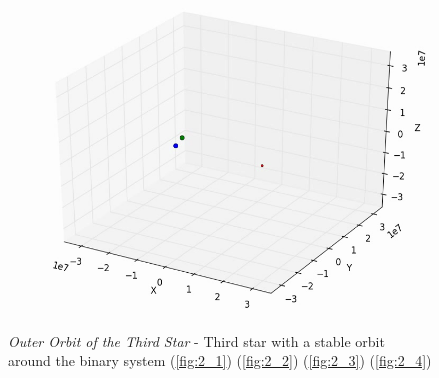 \documentclass[10pt,letterpaper]{article}
\begin{document}
\begin{figure}[!htb]
  \subcaption{}\label{fig:2_3}
\endminipage
{}
  \includegraphics[width=\linewidth]{figures/three_body/2_4.png}
  \subcaption{}\label{fig:2_4}
\endminipage
\caption{ \textit{Outer Orbit of the Third Star} - Third star with a stable orbit around the binary system
(\ref{fig:2_1}) 
(\ref{fig:2_2}) 
(\ref{fig:2_3}) 
(\ref{fig:2_4})}\label{fig:2}
\end{figure}
\end{document}

